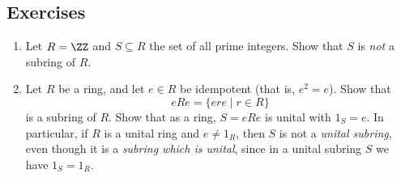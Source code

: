 \documentclass{article}
\begin{document}
\subsection*{Exercises}

\begin{enumerate}
\item Let $R = \ZZ$ and $S \subseteq R$ the set of all prime integers. Show that $S$ is \emph{not} a subring of $R$.

\item Let $R$ be a ring, and let $e \in R$ be idempotent (that is, $e^2 = e$). Show that \[ eRe = \{ ere \mid r \in R \} \] is a subring of $R$. Show that as a ring, $S = eRe$ is unital with $1_S = e$. In particular, if $R$ is a unital ring and $e \neq 1_R$, then $S$ is not a \emph{unital subring}, even though it is a \emph{subring which is unital}, since in a unital subring $S$ we have $1_S = 1_R$.
\end{enumerate}
\end{document}
